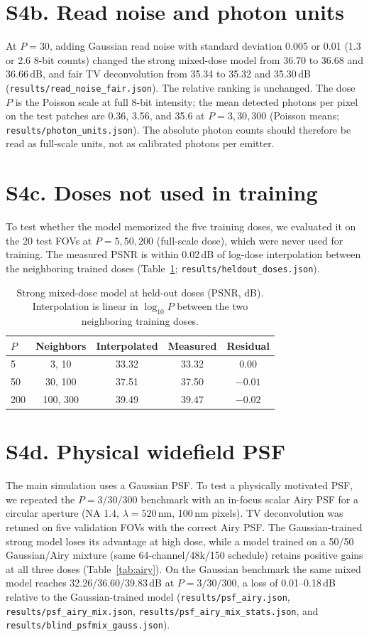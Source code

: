 \documentclass[11pt]{article}
\begin{document}
\section*{S4b. Read noise and photon units}
At $P=30$, adding Gaussian read noise with standard deviation 0.005 or 0.01
(1.3 or 2.6 8-bit counts) changed the strong mixed-dose model from 36.70 to
36.68 and 36.66\,dB, and fair TV deconvolution from 35.34 to 35.32 and
35.30\,dB (\texttt{results/read\_noise\_fair.json}). The relative ranking is
unchanged. The dose $P$ is the Poisson scale at full 8-bit
intensity; the mean detected photons per pixel on the test patches are 0.36,
3.56, and 35.6 at $P=3,30,300$ (Poisson means; \texttt{results/photon\_units.json}).
The absolute photon counts should therefore be read as full-scale units, not as
calibrated photons per emitter.

\section*{S4c. Doses not used in training}
To test whether the model memorized the five training doses, we evaluated it on
the 20 test FOVs at $P=5,50,200$ (full-scale dose), which were never used for
training.
The measured PSNR is within 0.02\,dB of log-dose interpolation between the
neighboring trained doses (Table~\ref{tab:heldout};
\texttt{results/heldout\_doses.json}).

\begin{table}[h]
\centering
\caption{Strong mixed-dose model at held-out doses (PSNR, dB). Interpolation is
linear in $\log_{10}P$ between the two neighboring training doses.}
\label{tab:heldout}
\begin{tabular}{lcccc}
\toprule
$P$ & Neighbors & Interpolated & Measured & Residual \\
\midrule
5   & 3, 10    & 33.32 & 33.32 & $0.00$ \\
50  & 30, 100  & 37.51 & 37.50 & $-0.01$ \\
200 & 100, 300 & 39.49 & 39.47 & $-0.02$ \\
\bottomrule
\end{tabular}
\end{table}

\section*{S4d. Physical widefield PSF}
The main simulation uses a Gaussian PSF. To test a physically motivated PSF,
we repeated the $P=3/30/300$ benchmark with an in-focus scalar Airy PSF for a
circular aperture (NA 1.4, $\lambda=520$\,nm, 100\,nm pixels). TV deconvolution
was retuned on five validation FOVs with the correct Airy PSF. The
Gaussian-trained strong model loses its advantage at high dose, while a model
trained on a 50/50 Gaussian/Airy mixture (same 64-channel/48k/150 schedule)
retains positive gains at all three doses (Table~\ref{tab:airy}). On the
Gaussian benchmark the same mixed model reaches 32.26/36.60/39.83\,dB at
$P=3/30/300$, a loss of 0.01--0.18\,dB relative to the Gaussian-trained model
(\texttt{results/psf\_airy.json}, \texttt{results/psf\_airy\_mix.json},
\texttt{results/psf\_airy\_mix\_stats.json}, and
\texttt{results/blind\_psfmix\_gauss.json}).
\end{document}
